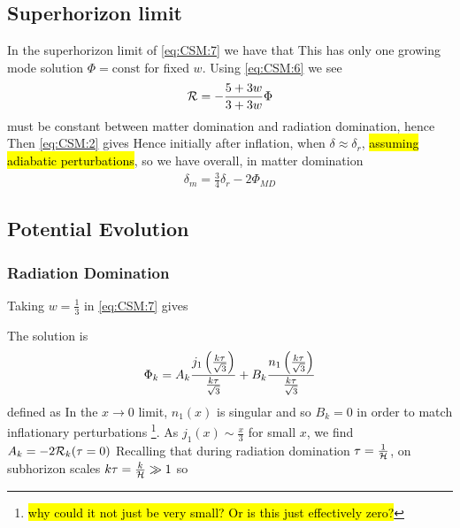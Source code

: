 \documentclass{article}
\begin{document}
\subsection{Superhorizon limit}
In the superhorizon limit of \ref{eq:CSM:7} we have that 
This has only one growing mode solution $\Phi = \text{const}$ for fixed $w$. Using \ref{eq:CSM:6} we see 
\begin{align} \label{eq:CSM:10}
\mathcal{R} = - \frac{5+3w}{3+3w} \Phi
\end{align}
must be constant between matter domination and radiation domination, hence 
Then \ref{eq:CSM:2} gives 
Hence initially after inflation, when $\delta \approx \delta_r$, \hl{assuming adiabatic perturbations}, 
so we have overall, in matter domination \begin{align}\label{eq:CSM:12}
    \delta_m = \frac{3}{4} \delta_r - 2\Phi_{MD}
\end{align}
\subsection{Potential Evolution}

\subsubsection*{Radiation Domination}
Taking $w=\frac{1}{3}$ in \ref{eq:CSM:7} gives 

The solution is 
\begin{align}\label{eq:CSM:11}
\Phi_k = A_k \frac{j_1\left( \frac{k\tau}{\sqrt{3}} \right)}{\frac{k\tau}{\sqrt{3}}} + B_k \frac{n_1\left( \frac{k\tau}{\sqrt{3}} \right)}{\frac{k\tau}{\sqrt{3}}}
\end{align}
defined as 
In the $x \to 0$ limit, $n_1(x)$ is singular and so $B_k = 0$ in order to match inflationary perturbations \footnote{\hl{why could it not just be very small? Or is this just effectively zero?}}. As $j_1(x) \sim \frac{x}{3}$ for small $x$, we find $A_k = -2\mathcal{R}_k(\tau=0) $
Recalling that during radiation domination $\tau = \frac{1}{\mathcal{H}}$, on subhorizon scales $k\tau = \frac{k}{\mathcal{H}} \gg 1$ so 
\end{document}
